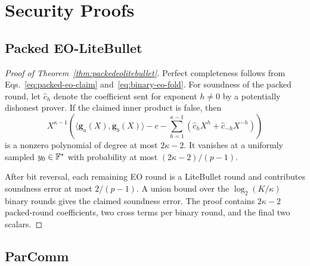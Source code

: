 \section{Security Proofs}
\label{appx:securityproofs}

\subsection{Packed EO-LiteBullet}
\label{appx:proof-packed-eo-litebullet}

\begin{proof}[Proof of Theorem~\ref{thm:packedeolitebullet}]
Perfect completeness follows from Eqs.~\eqref{eq:packed-eo-claim}
and~\eqref{eq:binary-eo-fold}.  For soundness of the packed round, let
$\widehat c_h$ denote the coefficient sent for exponent $h\ne0$ by a
potentially dishonest prover.  If the claimed inner product is false, then
\[
  X^{\kappa-1}\left(
    \langle\bm g_a(X),\bm g_b(X)\rangle-c
    -\sum_{h=1}^{\kappa-1}
      (\widehat c_hX^h+\widehat c_{-h}X^{-h})
  \right)
\]
is a nonzero polynomial of degree at most $2\kappa-2$.  It vanishes at a
uniformly sampled $y_0\in{\mathbb{F}}^*$ with probability at most
$(2\kappa-2)/(p-1)$.

After bit reversal, each remaining EO round is a LiteBullet round and
contributes soundness error at most $2/(p-1)$.  A union bound over the
$\log_2(K/\kappa)$ binary rounds gives the claimed soundness error.  The proof
contains $2\kappa-2$ packed-round coefficients, two cross terms per binary
round, and the final two scalars.
\end{proof}

\subsection{ParComm}
\label{appx:proof-parcomm}


